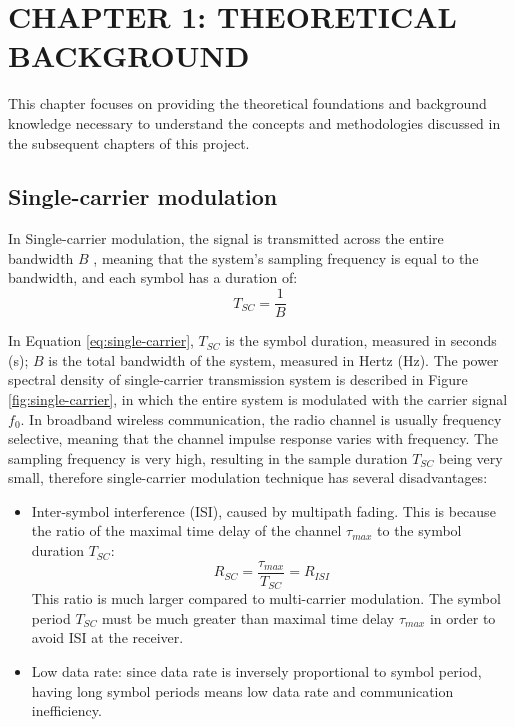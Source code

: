\section*{CHAPTER 1: THEORETICAL BACKGROUND}
\setcounter{section}{1}
\setcounter{subsection}{0}
\setcounter{figure}{0}
\setcounter{table}{0}

This chapter focuses on providing the theoretical foundations and background knowledge necessary to understand the concepts and methodologies discussed in the subsequent chapters of this project.

\subsection{Single-carrier modulation}
In Single-carrier modulation, the signal is transmitted across the entire bandwidth $B$ \cite{OFDM2006}, meaning that the system's sampling frequency is equal to the bandwidth, and each symbol has a duration of:
\begin{equation}
    T_{SC} = \frac{1}{B}
    \label{eq:single-carrier}
\end{equation}

In Equation \ref{eq:single-carrier}, $T_{SC}$ is the symbol duration, measured in seconds (s); $B$ is the total bandwidth of the system, measured in Hertz (Hz). The power spectral density of single-carrier transmission system is described in Figure \ref{fig:single-carrier}, in which the entire system is modulated with the carrier signal $f_0$. In broadband wireless communication, the radio channel is usually frequency selective, meaning that the channel impulse response varies with frequency. The sampling frequency is very high, resulting in the sample duration $T_{SC}$ being very small, therefore single-carrier modulation technique has several disadvantages:

\begin{itemize}
    \item Inter-symbol interference (ISI), caused by multipath fading. This is because the ratio of the maximal time delay of the channel $\tau_{max}$ to the symbol duration $T_{SC}$:
    \begin{equation}
        R_{SC} = \frac{\tau_{max}}{T_{SC}} = R_{ISI}
    \end{equation}
    This ratio is much larger compared to multi-carrier modulation. The symbol period $T_{SC}$ must be much greater than maximal time delay $\tau_{max}$ in order to avoid ISI at the receiver.
    \item Low data rate: since data rate is inversely proportional to symbol period, having long symbol periods means low data rate and communication inefficiency.
\end{itemize}

